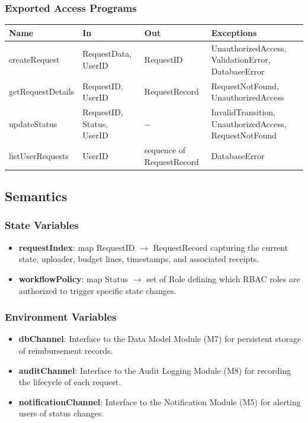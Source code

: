 \documentclass[12pt, titlepage]{article}
\begin{document}
\subsubsection{Exported Access Programs}

\begin{center}
\begin{tabular}{p{2.8cm} p{4.2cm} p{4.2cm} p{2.4cm}}
\toprule
\textbf{Name} & \textbf{In} & \textbf{Out} & \textbf{Exceptions} \\
\midrule
createRequest & RequestData, UserID & RequestID & UnauthorizedAccess, ValidationError, DatabaseError \\
getRequestDetails & RequestID, UserID & RequestRecord & RequestNotFound, UnauthorizedAccess \\
updateStatus & RequestID, Status, UserID & $-$ & InvalidTransition, UnauthorizedAccess, RequestNotFound \\
listUserRequests & UserID & sequence of RequestRecord & DatabaseError \\
\bottomrule
\end{tabular}
\end{center}

\subsection{Semantics}

\subsubsection{State Variables}

\begin{itemize}
  \item \textbf{requestIndex}: map RequestID $\rightarrow$ RequestRecord capturing the current state, uploader, budget lines, timestamps, and associated receipts.
  \item \textbf{workflowPolicy}: map Status $\rightarrow$ set of Role defining which RBAC roles are authorized to trigger specific state changes.
\end{itemize}

\subsubsection{Environment Variables}

\begin{itemize}
  \item \textbf{dbChannel}: Interface to the Data Model Module (M7) for persistent storage of reimbursement records.
  \item \textbf{auditChannel}: Interface to the Audit Logging Module (M8) for recording the lifecycle of each request.
  \item \textbf{notificationChannel}: Interface to the Notification Module (M5) for alerting users of status changes.
\end{itemize}
\end{document}

